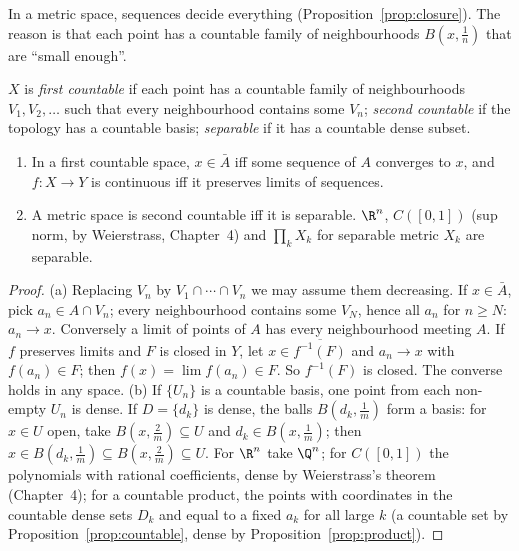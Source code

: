 In a metric space, sequences decide everything (Proposition~\ref{prop:closure}). The reason is that each point has a countable family of
neighbourhoods $B(x,\frac1n)$ that are ``small enough''.

\begin{definition}
$X$ is \emph{first countable} if each point has a countable family of neighbourhoods $V_1,V_2,\ldots$ such that every neighbourhood contains
some $V_n$; \emph{second countable} if the topology has a countable basis; \emph{separable} if it has a countable dense subset.
\end{definition}

\begin{proposition}\label{prop:sequences}
\begin{enumerate}[label=(\alph*)]
\item In a first countable space, $x\in\bar A$ iff some sequence of $A$ converges to $x$, and $f:X\to Y$ is continuous iff it preserves limits of
sequences.
\item A metric space is second countable iff it is separable. $\R^n$, $C([0,1])$ (sup norm, by Weierstrass, Chapter~4) and $\prod_k X_k$ for separable metric
$X_k$ are separable.
\end{enumerate}
\end{proposition}
\begin{proof}
(a) Replacing $V_n$ by $V_1\cap\cdots\cap V_n$ we may assume them decreasing. If $x\in\bar A$, pick $a_n\in A\cap V_n$; every neighbourhood contains some $V_N$,
hence all $a_n$ for $n\ge N$: $a_n\to x$. Conversely a limit of points of $A$ has every neighbourhood meeting $A$. If $f$ preserves limits and $F$ is
closed in $Y$, let $x\in\overline{f^{-1}(F)}$ and $a_n\to x$ with $f(a_n)\in F$; then $f(x)=\lim f(a_n)\in F$. So $f^{-1}(F)$ is closed. The converse holds in any space.
(b) If $\{U_n\}$ is a countable basis, one point from each non-empty $U_n$ is dense. If $D=\{d_k\}$ is dense, the balls $B(d_k,\frac1m)$ form a basis:
for $x\in U$ open, take $B(x,\frac2m)\subseteq U$ and $d_k\in B(x,\frac1m)$; then $x\in B(d_k,\frac1m)\subseteq B(x,\frac2m)\subseteq U$. For $\R^n$ take $\Q^n$; for $C([0,1])$ the
polynomials with rational coefficients, dense by Weierstrass's theorem (Chapter~4); for a countable product, the points with
coordinates in the countable dense sets $D_k$ and equal to a fixed $a_k$ for all large $k$ (a countable set by Proposition~\ref{prop:countable},
dense by Proposition~\ref{prop:product}).
\end{proof}

